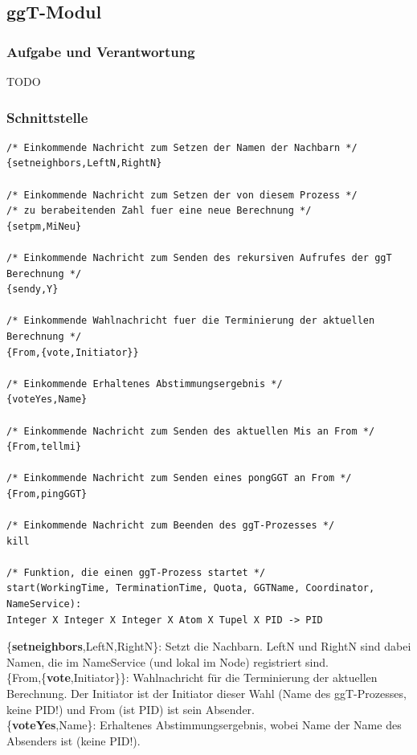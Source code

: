 \documentclass{article}
\begin{document}
\newpage

\subsection{ggT-Modul}
\subsubsection{Aufgabe und Verantwortung}
TODO

\subsubsection{Schnittstelle}
\begin{lstlisting}
/* Einkommende Nachricht zum Setzen der Namen der Nachbarn */
{setneighbors,LeftN,RightN}

/* Einkommende Nachricht zum Setzen der von diesem Prozess */
/* zu berabeitenden Zahl fuer eine neue Berechnung */
{setpm,MiNeu}

/* Einkommende Nachricht zum Senden des rekursiven Aufrufes der ggT Berechnung */
{sendy,Y}

/* Einkommende Wahlnachricht fuer die Terminierung der aktuellen Berechnung */
{From,{vote,Initiator}}

/* Einkommende Erhaltenes Abstimmungsergebnis */
{voteYes,Name}

/* Einkommende Nachricht zum Senden des aktuellen Mis an From */
{From,tellmi}

/* Einkommende Nachricht zum Senden eines pongGGT an From */
{From,pingGGT}

/* Einkommende Nachricht zum Beenden des ggT-Prozesses */
kill

/* Funktion, die einen ggT-Prozess startet */
start(WorkingTime, TerminationTime, Quota, GGTName, Coordinator, NameService):
Integer X Integer X Integer X Atom X Tupel X PID -> PID
\end{lstlisting}
\{\textbf{setneighbors},LeftN,RightN\}: Setzt die Nachbarn. LeftN und RightN sind dabei Namen, die im NameService
(und lokal im Node) registriert sind.\\

\{From,\{\textbf{vote},Initiator\}\}: Wahlnachricht für die Terminierung der aktuellen Berechnung. Der Initiator ist der
Initiator dieser Wahl (Name des ggT-Prozesses, keine PID!) und From (ist PID) ist sein Absender.\\

\{\textbf{voteYes},Name\}: Erhaltenes Abstimmungsergebnis, wobei Name der Name des Absenders ist (keine PID!).\\
\end{document}
